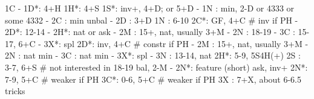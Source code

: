 1C - 
1D*: 4+H
1H*: 4+S
1S*: inv+, 4+D; or 5+D
   - 1N : min, 2-D or 4333 or some 4332
   - 2C : min unbal
   - 2D : 3+D
1N : 6-10
2C*: GF, 4+C  # inv if PH
   - 2D*: 12-14
		- 2H*: nat or ask
   - 2M : 15+, nat, usually 3+M
   - 2N : 18-19
   - 3C : 15-17, 6+C
   - 3X*: spl
2D*: inv, 4+C  # constr if PH
   - 2M : 15+, nat, usually 3+M
   - 2N : nat min
   - 3C : nat min
   - 3X*: spl
   - 3N : 13-14, nat
2H*: 5-9, 5S4H(+)
2S : 3-7, 6+S  # not interested in 18-19 bal, 2-M
   - 2N*: feature (short) ask, inv+
2N*: 7-9, 5+C  # weaker if PH
3C*: 0-6, 5+C  # weaker if PH
3X : 7+X, about 6-6.5 tricks
